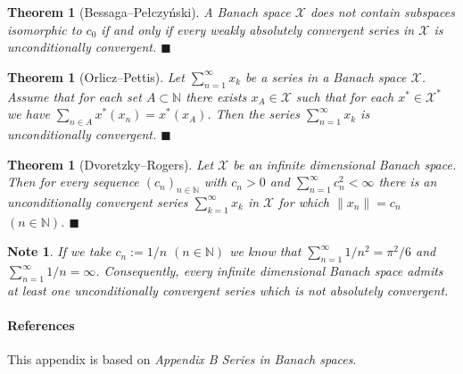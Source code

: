 \documentclass[a4paper, 12pt]{article}
\newtheorem{theo}[lem]{Theorem}
\newtheorem{note}[lem]{Note}
\newcommand*{\qedb}{\hfill\ensuremath{\blacksquare}}
\begin{document}
\begin{theo}[Bessaga\---Pełczyński] \label{all:bessaga-pelczynski-theorem} A Banach space $\mathcal{X}$ does not contain subspaces isomorphic to $c_0$ if and only if every weakly absolutely convergent series in $\mathcal{X}$ is unconditionally convergent. \qedb %
\end{theo}

\begin{theo}[Orlicz\---Pettis] \label{all:orlicz-pettis-theorem} Let $\sum^{\infty}_{n=1} x_k$ be a series in a Banach space $\mathcal{X}$. Assume that for each set $A \subset \mathbb{N}$ there exists $x_A \in \mathcal{X}$ such that for each $x^* \in \mathcal{X}^*$ we have $\sum\limits_{n \in A} x^*(x_n) = x^*(x_A)$. Then the series $\sum^{\infty}_{n=1} x_k$ is unconditionally convergent. \qedb
\end{theo}

\begin{theo}[Dvoretzky\---Rogers]\label{all:dvoretzky-rogers-theorem} Let $\mathcal{X}$ be an infinite dimensional Banach space. Then for every sequence $(c_n)_{n \in \mathbb{N}}$ with $c_n > 0$ and $\sum^{\infty}_{n=1} c^2_n < \infty$ there is an unconditionally convergent series $\sum^{\infty}_{k=1} x_k$ in $\mathcal{X}$ for which $\| x_n \| = c_n$ $(n \in \mathbb{N})$. \qedb
\end{theo}

\begin{note}\normalfont If we take $c_n := 1/n$ $(n \in \mathbb{N})$ we know that $\sum^{\infty}_{n=1} 1/n^2 = \pi^2/6$ and $\sum^{\infty}_{n=1} 1/n = \infty$. Consequently, every infinite dimensional Banach space admits at least one unconditionally convergent series which is not absolutely convergent. \end{note}

\paragraph*{References} This appendix is based on \cite{schwabik} \textit{Appendix B Series in Banach spaces}.

\newpage
\printbibliography
{}
\end{document}
